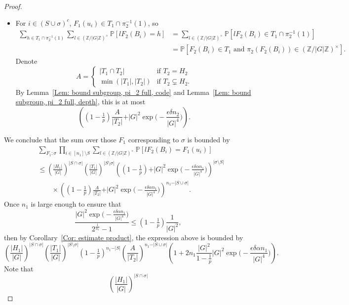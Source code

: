 \documentclass[10pt,a4paper]{amsart}
\newcommand{\PPP}{\mathbb{P}}
\newcommand{\Z}{\mathbb{Z}}
\newcommand{\ZG}{\Z/\abs{G}\Z}
\newcommand{\abs}[1]{\vert#1\vert}
\begin{document}
\begin{proof}
\begin{itemize}
    \item For $i\in (S\cup \sigma)^c$, $F_1(u_i)\in T_1\cap \pi_2^{-1}(1)$, so
    \begin{align*}
    \sum_{h\in T_1\cap \pi_2^{-1}(1)}
    \sum_{l\in (\Z/\abs{G}\Z)^{\times}} \PPP[l F_2(B_i)= h]
    &=\sum_{l\in (\Z/\abs{G}\Z)^{\times}} \PPP[l F_2(B_i)\in T_1\cap \pi_2^{-1}(1)]\\
    &=\PPP[ F_2(B_i)\in T_1 \text{ and }\pi_2(F_2(B_i))\in (\ZG)^{\times}].
    \end{align*}
    Denote
    \[
    A=\begin{cases}
        \abs{T_1\cap T_2} &\text{if } T_2=H_2\\
        \min(\abs{T_1},\abs{T_2}) &\text{if } T_2\subsetneq H_2.
    \end{cases}
    \]
    By Lemma~\ref{Lem: bound subgroup, pi_2 full, code} and Lemma~\ref{Lem: bound subgroup, pi_2 full, depth}, this is at most
    \[
     \left( (1-\tfrac{1}{p}) \frac{A}{\abs{T_2}}
    +\abs{G}^2\exp\Big(-\frac{\epsilon\delta n_2}{|G|^4}\Big) \right).
    \]
\end{itemize}
We conclude that the sum over those $F_1$ corresponding to $\sigma$ is bounded by
\begin{align*}
&\sum_{F_1:\sigma}
\prod_{i\in [n_1]\setminus S} \sum_{l\in (\Z/\abs{G}\Z)^{\times}} \PPP[l F_2(B_i)= F_1(u_i)]\\
&\leq \left(\frac{\abs{H_1}}{\abs{G}}\right)^{\abs{S\cap \sigma}}
\left(\frac{\abs{T_1}}{\abs{G}}\right)^{\abs{S\setminus \sigma}}
\left( (1-\tfrac{1}{p})
     +\abs{G}^2\exp\Big(-\frac{\epsilon\delta\alpha n_1}{|G|^4}\Big) \right)^{\abs{\sigma\setminus S}}\\ 
&\quad\quad\times
\left( (1-\tfrac{1}{p}) \frac{A}{\abs{T_2}}
    +\abs{G}^2\exp\Big(-\frac{\epsilon\delta \alpha n_1}{|G|^4}\Big) \right)^{n_1-\abs{S\cup \sigma}}.
\end{align*}
Once $n_1$ is large enough to ensure that
\[
\frac{\abs{G}^2\exp\Big(-\frac{\epsilon\delta \alpha n_1}{|G|^4}\Big)}{2^{\frac{1}{n_1}}-1}
\leq (1-\tfrac{1}{p}) \frac{1}{\abs{G}^2},
\]
then by Corollary~\ref{Cor: estimate product}, the expression above is bounded by
\[
\left(\frac{\abs{H_1}}{\abs{G}}\right)^{\abs{S\cap \sigma}}
\left(\frac{\abs{T_1}}{\abs{G}}\right)^{\abs{S\setminus \sigma}}
(1-\tfrac{1}{p})^{n_1-\abs{S}} 
\left(\frac{A}{\abs{T_2}}\right)^{n_1-\abs{S\cup \sigma}}
\left(1+ 2n_1\frac{\abs{G}^2}{1-\frac{1}{p}} \abs{G}^2\exp\Big(-\frac{\epsilon\delta \alpha n_1}{|G|^4}\Big)\right).
\]
Note that
\[
\left(\frac{\abs{H_1}}{\abs{G}}\right)^{\abs{S\cap \sigma}}
\]
\end{proof}
\end{document}
